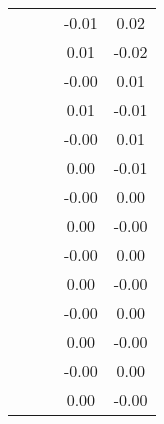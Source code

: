 \begin{table}
\begin{tabular}{c|cc|cc|}
\multicolumn{1}{|c|}{} & \multicolumn{1}{|c|}{} & \multicolumn{1}{|c|}{} & \multicolumn{1}{|c|}{     -0.01} & \multicolumn{1}{|c|}{      0.02} \\ 
\multicolumn{1}{|c|}{} & \multicolumn{1}{|c|}{} & \multicolumn{1}{|c|}{} & \multicolumn{1}{|c|}{      0.01} & \multicolumn{1}{|c|}{     -0.02} \\ 
\multicolumn{1}{|c|}{} & \multicolumn{1}{|c|}{} & \multicolumn{1}{|c|}{} & \multicolumn{1}{|c|}{     -0.00} & \multicolumn{1}{|c|}{      0.01} \\ 
\multicolumn{1}{|c|}{} & \multicolumn{1}{|c|}{} & \multicolumn{1}{|c|}{} & \multicolumn{1}{|c|}{      0.01} & \multicolumn{1}{|c|}{     -0.01} \\ 
\multicolumn{1}{|c|}{} & \multicolumn{1}{|c|}{} & \multicolumn{1}{|c|}{} & \multicolumn{1}{|c|}{     -0.00} & \multicolumn{1}{|c|}{      0.01} \\ 
\multicolumn{1}{|c|}{} & \multicolumn{1}{|c|}{} & \multicolumn{1}{|c|}{} & \multicolumn{1}{|c|}{      0.00} & \multicolumn{1}{|c|}{     -0.01} \\ 
\multicolumn{1}{|c|}{} & \multicolumn{1}{|c|}{} & \multicolumn{1}{|c|}{} & \multicolumn{1}{|c|}{     -0.00} & \multicolumn{1}{|c|}{      0.00} \\ 
\multicolumn{1}{|c|}{} & \multicolumn{1}{|c|}{} & \multicolumn{1}{|c|}{} & \multicolumn{1}{|c|}{      0.00} & \multicolumn{1}{|c|}{     -0.00} \\ 
\multicolumn{1}{|c|}{} & \multicolumn{1}{|c|}{} & \multicolumn{1}{|c|}{} & \multicolumn{1}{|c|}{     -0.00} & \multicolumn{1}{|c|}{      0.00} \\ 
\multicolumn{1}{|c|}{} & \multicolumn{1}{|c|}{} & \multicolumn{1}{|c|}{} & \multicolumn{1}{|c|}{      0.00} & \multicolumn{1}{|c|}{     -0.00} \\ 
\multicolumn{1}{|c|}{} & \multicolumn{1}{|c|}{} & \multicolumn{1}{|c|}{} & \multicolumn{1}{|c|}{     -0.00} & \multicolumn{1}{|c|}{      0.00} \\ 
\multicolumn{1}{|c|}{} & \multicolumn{1}{|c|}{} & \multicolumn{1}{|c|}{} & \multicolumn{1}{|c|}{      0.00} & \multicolumn{1}{|c|}{     -0.00} \\ 
\multicolumn{1}{|c|}{} & \multicolumn{1}{|c|}{} & \multicolumn{1}{|c|}{} & \multicolumn{1}{|c|}{     -0.00} & \multicolumn{1}{|c|}{      0.00} \\ 
\multicolumn{1}{|c|}{} & \multicolumn{1}{|c|}{} & \multicolumn{1}{|c|}{} & \multicolumn{1}{|c|}{      0.00} & \multicolumn{1}{|c|}{     -0.00} \\ 

\end{tabular}
\end{table}
